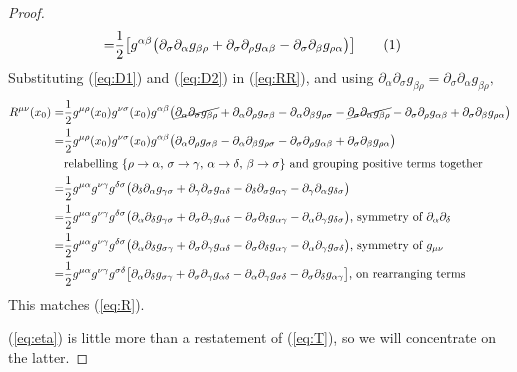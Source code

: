 \documentclass[]{article}
\newcommand\numberthis{\addtocounter{equation}{1}\tag{\theequation}}
\begin{document}
\begin{proof}
\begin{align*}
	 =& \frac{1}{2}\big[g^{\alpha\beta}\big(\partial_{\sigma}\partial_{\alpha}g_{\beta\rho} + \partial_{\sigma}\partial_{\rho}g_{\alpha\beta} - \partial_{\sigma}\partial_{\beta}g_{\rho\alpha}\big)\big] \numberthis\label{eq:D2}
	\end{align*}
	Substituting (\ref{eq:D1}) and (\ref{eq:D2}) in (\ref{eq:RR}), and using $\partial_{\alpha}\partial_{\sigma}g_{\beta\rho}=\partial_{\sigma}\partial_{\alpha}g_{\beta\rho},$
	\begin{align*}
	R^{\mu\nu}(x_0)=& \frac{1}{2} g^{\mu\rho}(x_0)g^{\nu\sigma}(x_0)g^{\alpha\beta}\big(\cancel{\partial_{\alpha}\partial_{\sigma}g_{\beta\rho}} + \partial_{\alpha}\partial_{\rho} g_{\sigma\beta} - \partial_{\alpha}\partial_{\beta}g_{\rho\sigma} - \cancel{\partial_{\sigma}\partial_{\alpha}g_{\beta\rho}} - \partial_{\sigma}\partial_{\rho}g_{\alpha\beta} + \partial_{\sigma}\partial_{\beta}g_{\rho\alpha}\big)\\
	=& \frac{1}{2} g^{\mu\rho}(x_0)g^{\nu\sigma}(x_0)g^{\alpha\beta}\big( \partial_{\alpha}\partial_{\rho} g_{\sigma\beta} - \partial_{\alpha}\partial_{\beta}g_{\rho\sigma}  - \partial_{\sigma}\partial_{\rho}g_{\alpha\beta} + \partial_{\sigma}\partial_{\beta}g_{\rho\alpha}\big)\\
	&\text{relabelling } \{\rho\rightarrow \alpha \text{, } \sigma\rightarrow\gamma \text{, } \alpha\rightarrow\delta\text{, } \beta\rightarrow\sigma\} \text{ and grouping positive terms together}\\
	=& \frac{1}{2} g^{\mu\alpha}g^{\nu\gamma}g^{\delta\sigma} \big( \partial_{\delta}\partial_{\alpha}g_{\gamma\sigma} + \partial_{\gamma}\partial_{\sigma}g_{\alpha\delta} - \partial_{\delta}\partial_{\sigma}g_{\alpha\gamma} - \partial_{\gamma}\partial_{\alpha}g_{\delta\sigma}\big)\\
	=& \frac{1}{2} g^{\mu\alpha}g^{\nu\gamma}g^{\delta\sigma} \big( \partial_{\alpha}\partial_{\delta}g_{\gamma\sigma} + \partial_{\sigma}\partial_{\gamma}g_{\alpha\delta} - \partial_{\sigma}\partial_{\delta}g_{\alpha\gamma} - \partial_{\alpha}\partial_{\gamma}g_{\delta\sigma}\big) \text{, symmetry of $\partial_{\alpha}\partial_{\delta}$} \\
	=& \frac{1}{2} g^{\mu\alpha}g^{\nu\gamma}g^{\delta\sigma} \big( \partial_{\alpha}\partial_{\delta}g_{\sigma\gamma} + \partial_{\sigma}\partial_{\gamma}g_{\alpha\delta} - \partial_{\sigma}\partial_{\delta}g_{\alpha\gamma} - \partial_{\alpha}\partial_{\gamma}g_{\sigma\delta}\big) \text {, symmetry of $g_{\mu\nu}$}\\
	= & \frac{1}{2}g^{\mu\alpha}g^{\nu\gamma}g^{\sigma\delta}\big[\partial_{\alpha}\partial_{\delta}g_{\sigma\gamma} + \partial_{\sigma}\partial_{\gamma}g_{\alpha\delta} - \partial_{\alpha}\partial_{\gamma}g_{\sigma\delta} - \partial_{\sigma}\partial_{\delta}g_{\alpha\gamma}\big] \text{, on rearranging terms}\\
	\end{align*}
	This matches (\ref{eq:R}).
	
	
	(\ref{eq:eta}) is little more than a restatement of (\ref{eq:T}), so we will concentrate on the latter.
\end{proof}
\end{document}

